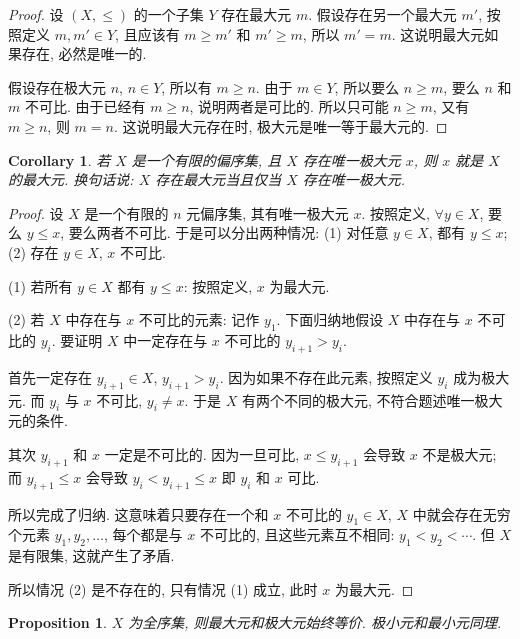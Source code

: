 \documentclass[UTF8]{ctexart}
\theoremstyle{mystyle}
\newtheorem{proposition}{Proposition}[section]
\theoremstyle{myremark}
\theoremstyle{plain}
\newtheorem{corollary}{Corollary}[section]
\begin{document}
\begin{proof}
    设 $ (X, \le) $ 的一个子集 $ Y $ 存在最大元 $ m $. 假设存在另一个最大元 $ m' $, 按照定义 $ m, m' \in Y $, 且应该有 $ m \ge m' $ 和 $ m' \ge m $, 所以 $ m' = m $. 这说明最大元如果存在, 必然是唯一的.

    假设存在极大元 $ n $, $ n \in Y $, 所以有 $ m \ge n $.
    由于 $ m \in Y $, 所以要么 $ n \ge m $, 要么 $ n $ 和 $ m $ 不可比. 由于已经有 $ m \ge n $, 说明两者是可比的. 所以只可能 $ n \ge m $, 又有 $ m \ge n $, 则 $ m = n $. 这说明最大元存在时, 极大元是唯一等于最大元的.
\end{proof}

\begin{corollary}
    若 $ X $ 是一个有限的偏序集, 且 $ X $ 存在唯一极大元 $ x $, 则 $ x $ 就是 $ X $ 的最大元. 换句话说: $ X $ 存在最大元当且仅当 $ X $ 存在唯一极大元.
\end{corollary}

\begin{proof}
    设 $ X $ 是一个有限的 $ n $ 元偏序集, 其有唯一极大元 $ x $. 按照定义, $ \forall y \in X $, 要么 $ y \le x $, 要么两者不可比. 于是可以分出两种情况: (1) 对任意 $ y \in X $, 都有 $ y \le x $; (2) 存在 $ y \in X $, $ x $ 不可比.

    (1) 若所有 $ y \in X $ 都有 $ y \le x $: 按照定义, $ x $ 为最大元.

    (2) 若 $ X $ 中存在与 $ x $ 不可比的元素: 记作 $ y_1 $. 下面归纳地假设 $ X $ 中存在与 $ x $ 不可比的 $ y_i $. 要证明 $ X $ 中一定存在与 $ x $ 不可比的 $ y_{i + 1} > y_i $.

    首先一定存在 $ y_{i + 1} \in X $, $ y_{i + 1} > y_i $. 因为如果不存在此元素, 按照定义 $ y_i $ 成为极大元. 而 $ y_i $ 与 $ x $ 不可比, $ y_i \neq x $. 于是 $ X $ 有两个不同的极大元, 不符合题述唯一极大元的条件.

    其次 $ y_{i + 1} $ 和 $ x $ 一定是不可比的. 因为一旦可比, $ x \le y_{i + 1} $ 会导致 $ x $ 不是极大元; 而 $ y_{i + 1} \le x $ 会导致 $ y_i < y_{i + 1} \le x $ 即 $ y_i $ 和 $ x $ 可比.

    所以完成了归纳. 这意味着只要存在一个和 $ x $ 不可比的 $ y_1 \in X $, $ X $ 中就会存在无穷个元素 $ y_1, y_2, \dots $, 每个都是与 $ x $ 不可比的, 且这些元素互不相同: $ y_1 < y_2 < \cdots $. 但 $ X $ 是有限集, 这就产生了矛盾. 
    
    所以情况 (2) 是不存在的, 只有情况 (1) 成立, 此时 $ x $ 为最大元.
\end{proof}

\begin{proposition}
    $ X $ 为全序集, 则最大元和极大元始终等价. 极小元和最小元同理.
\end{proposition}
\end{document}
